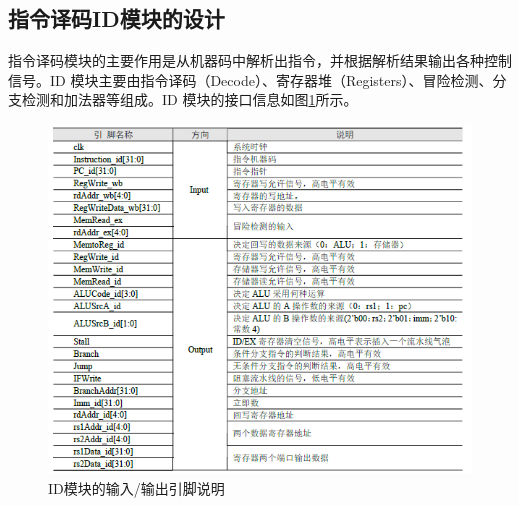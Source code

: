 \documentclass{../source/zjureport}
\begin{document}
        \subsection{指令译码ID模块的设计}
        指令译码模块的主要作用是从机器码中解析出指令，并根据解析结果输出各种控制信号。ID 模块主要由指令译码（Decode）、寄存器堆（Registers）、冒险检测、分支检测和加法器等组成。ID 模块的接口信息如图\ref{ID模块的输入输出引脚说明}所示。
        \begin{figure}[H]
            \centering
            \includegraphics[]{figure/ID模块的输入输出引脚说明.png}
            \caption{ID模块的输入/输出引脚说明}
            \label{ID模块的输入输出引脚说明}
        \end{figure}
\end{document}
